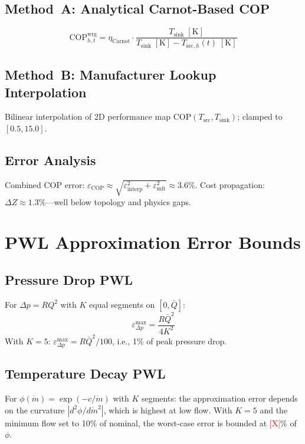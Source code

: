\documentclass[review,3p]{elsarticle}
\newcommand{\placeholder}[1]{\textcolor{red}{[#1]}}
\begin{document}
\subsection{Method~A: Analytical Carnot-Based COP}
\begin{equation}
\mathrm{COP}_{h,t}^{\mathrm{wrg}} = \eta_{\mathrm{Carnot}}
\cdot \frac{T_{\mathrm{sink}} \;[\mathrm{K}]}{
T_{\mathrm{sink}} \;[\mathrm{K}]
- T_{\mathrm{src},h}(t) \;[\mathrm{K}]}
\end{equation}

\subsection{Method~B: Manufacturer Lookup Interpolation}

Bilinear interpolation of 2D performance map
$\mathrm{COP}(T_{\mathrm{src}}, T_{\mathrm{sink}})$; clamped to
$[0.5, 15.0]$.

\subsection{Error Analysis}

Combined COP error:
$\varepsilon_{\mathrm{COP}} \approx
\sqrt{\varepsilon_{\mathrm{interp}}^2
+ \varepsilon_{\mathrm{mfr}}^2} \approx 3.6\%$.
Cost propagation: $\Delta Z \approx 1.3\%$---well below topology
and physics gaps.

\section{PWL Approximation Error Bounds}
\label{app:pwl}

\subsection{Pressure Drop PWL}

For $\Delta p = R Q^2$ with $K$ equal segments on $[0, \bar{Q}]$:
\begin{equation}
\varepsilon_{\Delta p}^{\max} = \frac{R \bar{Q}^2}{4 K^2}
\end{equation}
With $K=5$: $\varepsilon_{\Delta p}^{\max} = R \bar{Q}^2 / 100$,
i.e., 1\% of peak pressure drop.

\subsection{Temperature Decay PWL}

For $\phi(\dot{m}) = \exp(-c/\dot{m})$ with $K$ segments:
the approximation error depends on the curvature
$|d^2\phi/d\dot{m}^2|$, which is highest at low flow. With $K=5$
and the minimum flow set to 10\% of nominal, the worst-case error
is bounded at \placeholder{X}\% of $\phi$.
\end{document}
